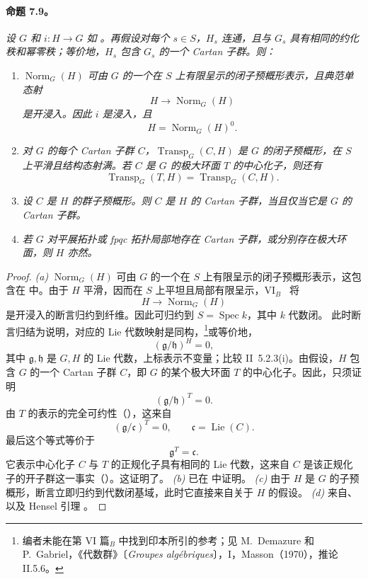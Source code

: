 \paragraph{\textbf{命题 7.9。}}
\emph{设 \(G\) 和 \(i:H\to G\) 如 。再假设对每个 \(s\in S\)，\(H_s\) 连通，且与 \(G_s\) 具有相同的约化秩和幂零秩；等价地，\(H_s\) 包含 \(G_s\) 的一个 Cartan 子群。则：}
\begin{enumerate}
\item[\emph{(a)}] \emph{\(\operatorname{Norm}_G(H)\) 可由 \(G\) 的一个在 \(S\) 上有限呈示的闭子预概形表示，且典范单态射}
\[
  H\longrightarrow\operatorname{Norm}_G(H)
\]
\emph{是开浸入。因此 \(i\) 是浸入，且}
\[
  H=\operatorname{Norm}_G(H)^0.
\]
\item[\emph{(b)}] \emph{对 \(G\) 的每个 Cartan 子群 \(C\)，\(\operatorname{Transp}_G(C,H)\) 是 \(G\) 的闭子预概形，在 \(S\) 上平滑且结构态射满。若 \(C\) 是 \(G\) 的极大环面 \(T\) 的中心化子，则还有}
\[
  \operatorname{Transp}_G(T,H)
  =
  \operatorname{Transp}_G(C,H).
\]
\item[\emph{(c)}] \emph{设 \(C\) 是 \(H\) 的群子预概形。则 \(C\) 是 \(H\) 的 Cartan 子群，当且仅当它是 \(G\) 的 Cartan 子群。}
\item[\emph{(d)}] \emph{若 \(G\) 对平展拓扑或 fpqc 拓扑局部地存在 Cartan 子群，或分别存在极大环面，则 \(H\) 亦然。}
\end{enumerate}
\begin{proof}
\emph{(a)} \(\operatorname{Norm}_G(H)\) 可由 \(G\) 的一个在 \(S\) 上有限呈示的闭子预概形表示，这包含在  中。由于 \(H\) 平滑，因而在 \(S\) 上平坦且局部有限呈示，VI\(_B\)~ 将
\[
  H\longrightarrow\operatorname{Norm}_G(H)
\]
是开浸入的断言归约到纤维。因此可归约到 \(S=\operatorname{Spec}k\)，其中 \(k\) 代数闭。
此时断言归结为说明，对应的 Lie 代数映射是同构，\footnote{编者未能在第 VI 篇\(_B\) 中找到印本所引的参考；见 M.\ Demazure 和 P.\ Gabriel，《代数群》〔\emph{Groupes algébriques}〕，I，Masson（1970），推论 II.5.6。}或等价地，
\[
  (\mathfrak g/\mathfrak h)^H=0,
\]
其中 \(\mathfrak g,\mathfrak h\) 是 \(G,H\) 的 Lie 代数，上标表示不变量；比较 II~5.2.3(i)。由假设，\(H\) 包含 \(G\) 的一个 Cartan 子群 \(C\)，即 \(G\) 的某个极大环面 \(T\) 的中心化子。因此，只须证明
\[
  (\mathfrak g/\mathfrak h)^T=0.
\]
由 \(T\) 的表示的完全可约性（），这来自
\[
  (\mathfrak g/\mathfrak c)^T=0,
  \qquad \mathfrak c=\operatorname{Lie}(C).
\]
最后这个等式等价于
\[
  \mathfrak g^T=\mathfrak c.
\]
它表示中心化子 \(C\) 与 \(T\) 的正规化子具有相同的 Lie 代数，这来自 \(C\) 是该正规化子的开子群这一事实（）。这证明了\textup{}。
\emph{(b)} 已在  中证明。
\emph{(c)} 由于 \(H\) 是 \(G\) 的子预概形，断言立即归约到代数闭基域，此时它直接来自关于 \(H\) 的假设。
\emph{(d)} 来自\textup{}、\textup{} 以及 Hensel 引理 。
\end{proof}
